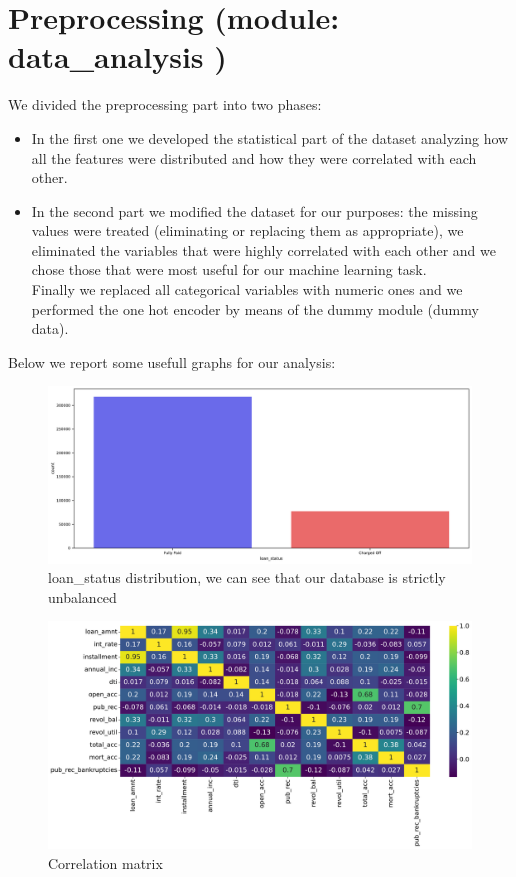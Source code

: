 \documentclass[french]{scrartcl}
\begin{document}
\section{Preprocessing (module: data\_analysis )}
We divided the preprocessing part into two phases: 
\begin{itemize}
	\item In the first one we developed the statistical part of the dataset analyzing how all the features were distributed and how they were correlated with each other.
	\item In the second part we modified the dataset for our purposes: the missing values were treated (eliminating or replacing them as appropriate), we eliminated the variables that were highly correlated with each other and  we chose those that were most useful for our machine learning task.\\
	Finally we replaced all categorical variables with numeric ones and we performed the one hot encoder by means of the dummy module (dummy data).\\
\end{itemize}
Below we report some usefull graphs for our analysis:
	\begin{figure}[h!]
		\centering
		\includegraphics[scale=0.3]{figures/(1)pf_vs_co.pdf}
		\caption{loan\_status distribution, we can see that our database is strictly unbalanced}
	\end{figure}
	\begin{figure}[h!]
	    \centering
	    \includegraphics[scale=0.3]{figures/(2)corr_matrix}
	    \caption{Correlation matrix}
	\end{figure}
\end{document}
